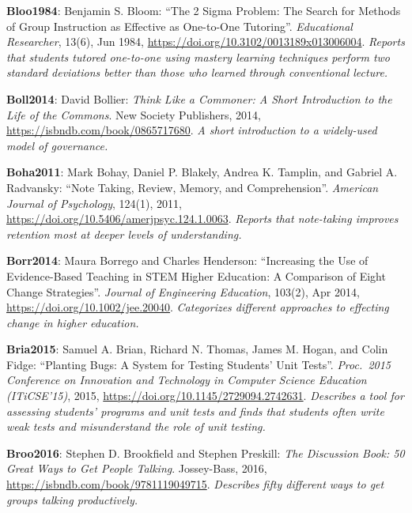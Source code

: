 \textbf{\hypertarget{b:Bloo1984}{Bloo1984}\label{b:Bloo1984}}: Benjamin S. Bloom: ``The 2 Sigma Problem: The Search for Methods of Group Instruction as Effective as One-to-One Tutoring''. \emph{Educational Researcher}, 13(6), Jun 1984, \url{https://doi.org/10.3102/0013189x013006004}. \emph{Reports that students tutored one-to-one using mastery learning techniques perform two standard deviations better than those who learned through conventional lecture.}

\textbf{\hypertarget{b:Boll2014}{Boll2014}\label{b:Boll2014}}: David Bollier: \emph{Think Like a Commoner: A Short Introduction to the Life of the Commons}. New Society Publishers, 2014, \url{https://isbndb.com/book/0865717680}. \emph{A short introduction to a widely-used model of governance.}

\textbf{\hypertarget{b:Boha2011}{Boha2011}\label{b:Boha2011}}: Mark Bohay, Daniel P. Blakely, Andrea K. Tamplin, and Gabriel A. Radvansky: ``Note Taking, Review, Memory, and Comprehension''. \emph{American Journal of Psychology}, 124(1), 2011, \url{https://doi.org/10.5406/amerjpsyc.124.1.0063}. \emph{Reports that note-taking improves retention most at deeper levels of understanding.}

\textbf{\hypertarget{b:Borr2014}{Borr2014}\label{b:Borr2014}}: Maura Borrego and Charles Henderson: ``Increasing the Use of Evidence-Based Teaching in STEM Higher Education: A Comparison of Eight Change Strategies''. \emph{Journal of Engineering Education}, 103(2), Apr 2014, \url{https://doi.org/10.1002/jee.20040}. \emph{Categorizes different approaches to effecting change in higher education.}

\textbf{\hypertarget{b:Bria2015}{Bria2015}\label{b:Bria2015}}: Samuel A. Brian, Richard N. Thomas, James M. Hogan, and Colin Fidge: ``Planting Bugs: A System for Testing Students' Unit Tests''. \emph{Proc.\ 2015 Conference on Innovation and Technology in Computer Science Education (ITiCSE'15)}, 2015, \url{https://doi.org/10.1145/2729094.2742631}. \emph{Describes a tool for assessing students' programs and unit tests and finds that students often write weak tests and misunderstand the role of unit testing.}

\textbf{\hypertarget{b:Broo2016}{Broo2016}\label{b:Broo2016}}: Stephen D. Brookfield and Stephen Preskill: \emph{The Discussion Book: 50 Great Ways to Get People Talking}. Jossey-Bass, 2016, \url{https://isbndb.com/book/9781119049715}. \emph{Describes fifty different ways to get groups talking productively.}

